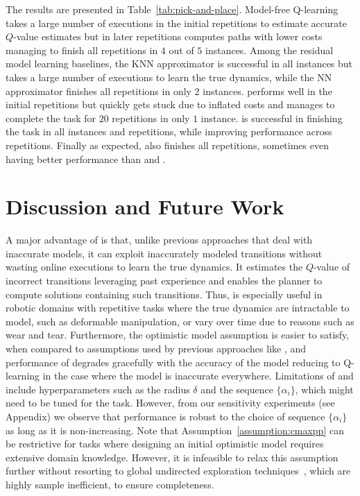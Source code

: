The results are presented in Table~\ref{tab:pick-and-place}. 
Model-free Q-learning takes a large number of executions in the
initial repetitions to estimate accurate $Q$-value estimates but in
later repetitions computes paths with lower costs managing to finish all
repetitions in $4$ out of $5$ instances. Among the residual model
learning baselines, the KNN approximator is successful in all
instances but takes a large number of executions to learn the true
dynamics, while the NN approximator finishes all repetitions in only
$2$ instances. \cmax{} performs well in the initial repetitions but
quickly gets stuck due to inflated costs and manages to complete the
task for $20$ repetitions in only $1$ instance. \cmaxpp{} is successful in
finishing the 
task in all instances and repetitions, while improving performance
across repetitions. Finally as expected, \acmaxpp{} also finishes all
repetitions, sometimes even having better performance than \cmax{} and
\cmaxpp{}.



\section{Discussion and Future Work}
\label{sec:disc-concl}

A major advantage of \cmaxpp{} is that, unlike previous approaches
that deal with inaccurate models, it can exploit inaccurately modeled
transitions without wasting online executions to learn the true
dynamics. It estimates the $Q$-value of incorrect transitions
leveraging past experience and enables the planner to compute solutions
containing such transitions. Thus, \cmaxpp{} is especially useful in
robotic domains with repetitive tasks where the true dynamics are
intractable to model, such as deformable manipulation, or vary
over time due to reasons such as wear and tear. Furthermore, the optimistic model assumption is
easier to satisfy, when compared to assumptions used by previous
approaches like \cmax{}, and performance of \cmaxpp{} degrades
gracefully with the accuracy of the model reducing to Q-learning in
the case where the model is inaccurate everywhere.
Limitations of
\cmaxpp{} and \acmaxpp{} include hyperparameters such as the
radius $\delta$ and the sequence $\{\alpha_i\}$, which might need to
be tuned for the task.
However, from our sensitivity experiments (see Appendix) we observe
that \acmaxpp{} performance is robust to the choice of sequence
$\{\alpha_i\}$ as long as it is non-increasing.
Note that Assumption~\ref{assumption:cmaxpp} can
be restrictive for tasks where designing an initial optimistic
model requires extensive domain
knowledge. However, it is infeasible to relax this assumption further
without resorting to global undirected exploration
techniques~\cite{Thrun-1992-15850}, which are highly sample
inefficient, to ensure completeness.

